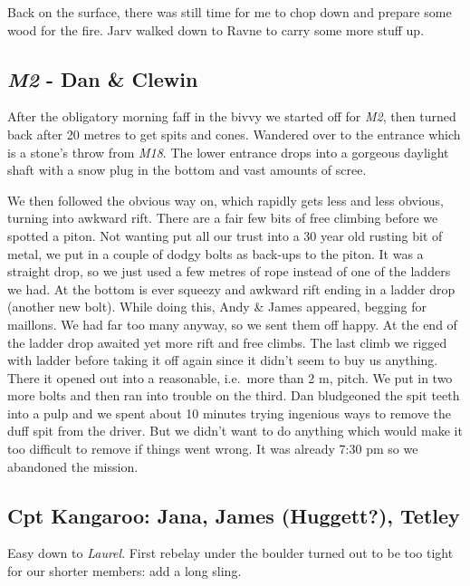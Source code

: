Back on the surface, there was still time for me to chop down and
prepare some wood for the fire. Jarv walked down to Ravne to carry some
more stuff up.

\hypertarget{m2---dan-clewin}{%
\subsection{\texorpdfstring{\emph{M2} - Dan \&
Clewin}{M2 - Dan \& Clewin}}\label{m2---dan-clewin}}

After the obligatory morning faff in the bivvy we started off for
\emph{M2}, then turned back after 20 metres to get spits and cones.
Wandered over to the entrance which is a stone's throw from \emph{M18}.
The lower entrance drops into a gorgeous daylight shaft with a snow plug
in the bottom and vast amounts of scree.

We then followed the obvious way on, which rapidly gets less and less
obvious, turning into awkward rift. There are a fair few bits of free
climbing before we spotted a piton. Not wanting put all our trust into a
30 year old rusting bit of metal, we put in a couple of dodgy bolts as
back-ups to the piton. It was a straight drop, so we just used a few
metres of rope instead of one of the ladders we had. At the bottom is
ever squeezy and awkward rift ending in a ladder drop (another new
bolt). While doing this, Andy \& James appeared, begging for maillons.
We had far too many anyway, so we sent them off happy. At the end of the
ladder drop awaited yet more rift and free climbs. The last climb we
rigged with ladder before taking it off again since it didn't seem to
buy us anything. There it opened out into a reasonable, i.e.~more than 2
m, pitch. We put in two more bolts and then ran into trouble on the
third. Dan bludgeoned the spit teeth into a pulp and we spent about 10
minutes trying ingenious ways to remove the duff spit from the driver.
But we didn't want to do anything which would make it too difficult to
remove if things went wrong. It was already 7:30 pm so we abandoned the
mission.


\hypertarget{cpt-kangaroo-jana-james-huggett-tetley}{%
\subsection{Cpt Kangaroo: Jana, James (Huggett?),
Tetley}\label{cpt-kangaroo-jana-james-huggett-tetley}}

Easy down to \emph{Laurel}. First rebelay under the boulder turned out
to be too tight for our shorter members: add a long sling.

